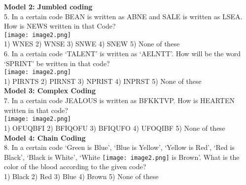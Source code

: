 \documentclass[
]{article}
\begin{document}
\textbf{Model 2: Jumbled coding}\\

5. In a certain code BEAN is written as ABNE and SALE is written as LSEA. How is NEWS written in that Code?\\
\texttt{[image: image2.png]}\\
1) WNES \hspace{2mm}2) WNSE \hspace{2mm}3) SNWE \hspace{2mm}4) SNEW \hspace{2mm}5) None of these\\


6. In a certain code ‘TALENT’ is written as ‘AELNTT’. How will be the word ‘SPRINT’ be written in that code?\\
\texttt{[image: image2.png]}\\
1) PIRNTS \hspace{2mm}2) PIRNST \hspace{2mm}3) NPRIST \hspace{2mm}4) INPRST \hspace{2mm}5) None of these\\

\textbf{Model 3: Complex Coding}\\

7. In a certain code JEALOUS is written as BFKKTVP. How is HEARTEN written in that code?\\
\texttt{[image: image2.png]}\\
1) OFUQBFI \hspace{2mm}2) BFIQOFU \hspace{2mm}3) BFIQUFO \hspace{2mm}4) UFOQIBF \hspace{2mm}5) None of these\\

\textbf{Model 4: Chain Coding}\\

8. In a certain code ‘Green is Blue’, ‘Blue is Yellow’, ‘Yellow is Red’, ‘Red is Black’, ‘Black is White’, ‘White \texttt{[image: image2.png]} is Brown’. What is the color of the blood according to the given code?\\
1) Black \hspace{2mm}2) Red \hspace{2mm}3) Blue \hspace{2mm}4) Brown \hspace{2mm}5) None of these\\
\end{document}
